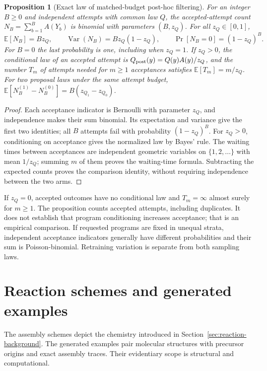\documentclass{article}
\newtheorem{proposition}[theorem]{Proposition}
\theoremstyle{definition}
\begin{document}
\begin{proposition}[Exact law of matched-budget post-hoc filtering]
\label{prop:posthoc-budget}
For an integer $B\geq0$ and independent attempts with common law $Q$, the accepted-attempt count
$N_B=\sum_{b=1}^BA(Y_b)$ is binomial with parameters $(B,z_Q)$. For all $z_Q\in[0,1]$,
\begin{equation}
 \mathbb E[N_B]=Bz_Q,\qquad
 \operatorname{Var}(N_B)=Bz_Q(1-z_Q),\qquad
 \Pr[N_B=0]=(1-z_Q)^B.
\end{equation}
For $B=0$ the last probability is one, including when $z_Q=1$. If $z_Q>0$, the conditional law of
an accepted attempt is $Q_{\rm post}(y)=Q(y)A(y)/z_Q$, and the number $T_m$ of attempts needed for
$m\geq1$ acceptances satisfies $\mathbb E[T_m]=m/z_Q$.
For two proposal laws under the same attempt budget,
$\mathbb E[N_B^{(1)}-N_B^{(0)}]=B(z_{Q_1}-z_{Q_0})$.
\end{proposition}
\begin{proof}
Each acceptance indicator is Bernoulli with parameter $z_Q$, and independence makes their sum
binomial. Its expectation and variance give the first two identities; all $B$ attempts fail with
probability $(1-z_Q)^B$. For $z_Q>0$, conditioning on acceptance gives the normalized law by
Bayes' rule. The waiting times between acceptances are independent geometric variables on
$\{1,2,\ldots\}$ with mean $1/z_Q$; summing $m$ of them proves the waiting-time formula.
Subtracting the expected counts proves the comparison identity, without requiring independence
between the two arms.
\end{proof}
If $z_Q=0$, accepted outcomes have no conditional law and $T_m=\infty$ almost surely for $m\geq1$.
The proposition counts accepted attempts, including duplicates. It does not establish that program
conditioning increases acceptance; that is an empirical comparison. If requested programs are fixed
in unequal strata, independent acceptance indicators generally have different probabilities and
their sum is Poisson-binomial. Retraining variation is separate from both sampling laws.

\clearpage

\section{Reaction schemes and generated examples}
\label{app:chemistry-examples}
\label{app:preliminaries}

The assembly schemes depict the chemistry introduced in Section~\ref{sec:reaction-background}.
The generated examples pair molecular structures with precursor origins and exact assembly traces.
Their evidentiary scope is structural and computational.
\end{document}
